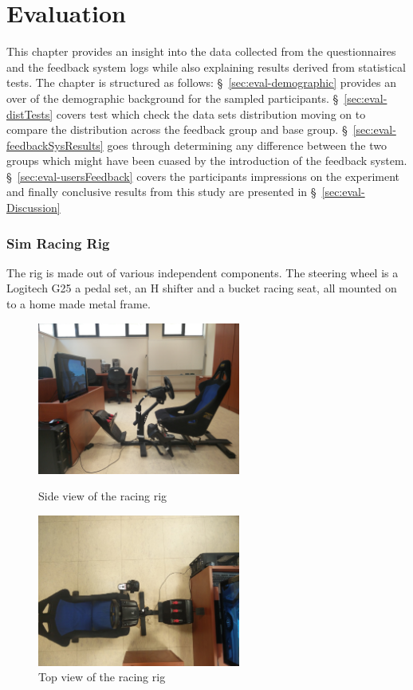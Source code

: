 \chapter{Evaluation}
This chapter provides an insight into the data collected from the questionnaires and the feedback system logs while also explaining results derived from statistical tests. The chapter is structured as follows: \S~\ref{sec:eval-demographic} provides an over of the demographic background for the sampled participants. \S~\ref{sec:eval-distTests} covers test which check the data sets distribution moving on to compare the distribution across the feedback group and base group. \S~\ref{sec:eval-feedbackSysResults} goes through determining any difference between the two groups which might have been cuased by the introduction of the feedback system.  \S~\ref{sec:eval-usersFeedback} covers the participants impressions on the experiment and finally conclusive results from this study are presented in \S~\ref{sec:eval-Discussion} 

\subsection{Sim Racing Rig}
\label{sec:imp-simRacingRig}
The rig is made out of various independent components. The steering wheel is a Logitech G25 a pedal set, an H shifter and a bucket racing seat, all mounted on to a home made metal frame.

\begin{figure}
\centering
\begin{minipage}{0.45\textwidth}
\centering
\includegraphics[height=5cm]{images/RacingRig}
\caption{Side view of the racing rig}
\end{minipage}\hfill
\begin{minipage}{0.45\textwidth}
\centering
\includegraphics[height=5cm]{images/RacingRig2}
\caption{Top view of the racing rig}
\end{minipage}
\end{figure}

